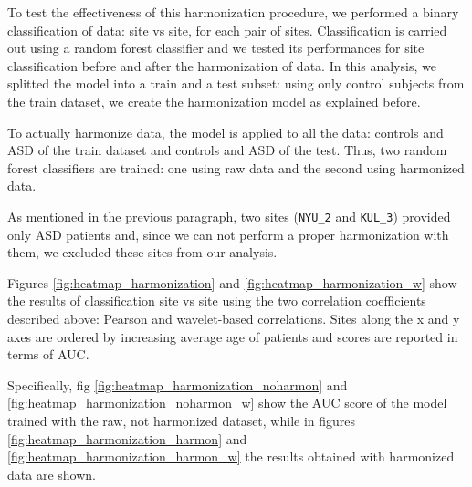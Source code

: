 \documentclass[11pt]{report}
\begin{document}
To test the effectiveness of this harmonization procedure, we performed a binary classification of data: site vs site, for each pair of sites.
Classification is carried out using a random forest classifier and we tested its performances for site classification before and after the harmonization of data.
In this analysis, we splitted the model into a train and a test subset: using only control subjects from the train dataset, we create the harmonization model as explained before.

To actually harmonize data, the model is applied to all the data: controls and ASD of the train dataset and controls and ASD of the test.
Thus, two random forest classifiers are trained: one using raw data and the second using harmonized data.


As mentioned in the previous paragraph, two sites (\texttt{NYU\_2} and \texttt{KUL\_3}) provided only ASD patients and, since we can not perform a proper harmonization with them, we excluded these sites from our analysis.

Figures \ref{fig:heatmap_harmonization} and \ref{fig:heatmap_harmonization_w} show the results of classification site vs site using the two correlation coefficients described above: Pearson and wavelet-based correlations.
Sites along the x and y axes are ordered by increasing average age of patients and scores are reported in terms of AUC.

Specifically, fig \ref{fig:heatmap_harmonization_noharmon} and \ref{fig:heatmap_harmonization_noharmon_w} show the AUC score of the model trained with the raw, not harmonized dataset, while in figures \ref{fig:heatmap_harmonization_harmon} and \ref{fig:heatmap_harmonization_harmon_w} the results obtained with harmonized data are shown.
\end{document}
